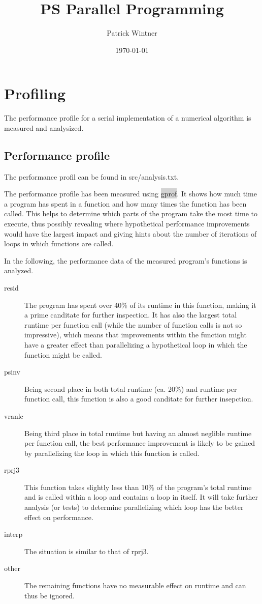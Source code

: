 \documentclass[parskip]{scrartcl}
\title{PS Parallel Programming}
\author{Patrick Wintner}
\date{\today}
\begin{document}
	\maketitle
	
	\section{Profiling}
	\label{profiling}
	The performance profile for a serial implementation of a numerical algorithm is measured and analysized.
	\subsection{Performance profile}
	The performance profil can be found in src/analysis.txt.

	The performance profile has been measured using \colorbox{lightgray}{gprof}. It shows how much time a program has spent in a function and how many times the function has been called. This helps to determine which parts of the program take the most time to execute, thus possibly revealing where hypothetical performance improvements would have the largest impact and giving hints about the number of iterations of loops in which functions are called.
	
	In the following, the performance data of the measured program's functions is analyzed.
	
	\begin{description}
		\item[resid] The program has spent over 40\% of its runtime in this function, making it a prime canditate for further inspection. It has also the largest total runtime per function call (while the number of function calls is not so impressive), which means that improvements within the function might have a greater effect than parallelizing a hypothetical loop in which the function might be called.
		\item[psinv] Being second place in both total runtime (ca. 20\%) and runtime per function call, this function is also a good canditate for further insepction.
		\item[vranlc] Being third place in total runtime but having an almost neglible runtime per function call, the best performance improvement is likely to be gained by parallelizing the loop in which this function is called.
		\item[rprj3] This function takes slightly less than 10\% of the program's total runtime and is called within a loop and contains a loop in itself. It will take further analysis (or tests) to determine parallelizing which loop has the better effect on performance. 
		\item[interp] The situation is similar to that of rprj3.
		\item[other] The remaining functions have no measurable effect on runtime and can thus be ignored.
	\end{description}
	
\end{document}
